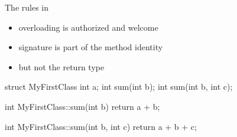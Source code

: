 \begin{frame}[fragile]
  \begin{block}{The rules in \cpp}
    \begin{itemize}
    \item overloading is authorized and welcome
    \item signature is part of the method identity
    \item but not the return type
    \end{itemize}
  \end{block}
  \begin{cppcode}
    struct MyFirstClass {
      int a;
      int sum(int b);
      int sum(int b, int c);
    }

    int MyFirstClass::sum(int b) { return a + b; }

    int MyFirstClass::sum(int b, int c) {
      return a + b + c;
    }
  \end{cppcode}
\end{frame}
